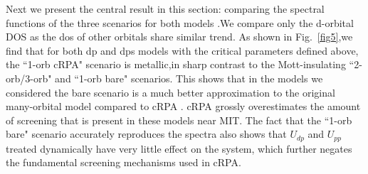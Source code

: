 \documentclass[10pt]{ruthesis}
\begin{document}
{Next we present the central result in this section: comparing the spectral functions of the three scenarios for both models .We compare only the d-orbital DOS  as the dos of other orbitals share similar trend. As shown in Fig.~\ref{fig5},we find that for both dp and dps models with the critical parameters defined above, the ``1-orb cRPA" scenario is metallic,in sharp contrast to the Mott-insulating ``2-orb/3-orb" and ``1-orb bare" scenarios. This shows that in the models we considered the bare scenario is a much better approximation to the original many-orbital model compared to cRPA . cRPA grossly overestimates the amount of screening that is present in these models near MIT. The fact that the ``1-orb bare" scenario accurately reproduces the spectra also shows that $U_{dp}$ and $U_{pp}$ treated dynamically have very little effect on the system, which further negates the fundamental screening mechanisms used in cRPA.



}
\end{document}

